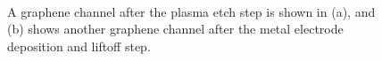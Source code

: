 \documentclass[
  a4paper,
]{scrbook}
\begin{document}
\begin{figure}
\begin{minipage}[t]{0.01\linewidth}
{~

}

\end{minipage}%
%
\begin{minipage}[t]{0.03\linewidth}

{\centering 


}

\end{minipage}%
%
\begin{minipage}[t]{0.01\linewidth}

{\centering 

~

}

\end{minipage}%
%
\begin{minipage}[t]{0.45\linewidth}

{\centering 


}

\end{minipage}%
%
\begin{minipage}[t]{0.01\linewidth}

{\centering 

~

}

\end{minipage}%

\caption{\label{fig-microscope-graphene-channel}A graphene channel after
the plasma etch step is shown in (a), and (b) shows another graphene
channel after the metal electrode deposition and liftoff step.}

\end{figure}
\end{document}
